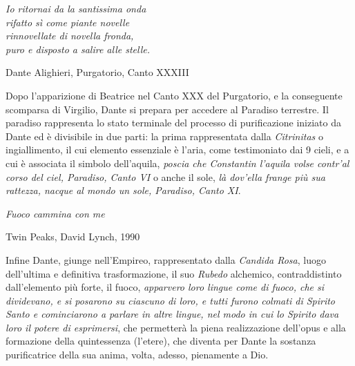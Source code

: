 \documentclass[a4paper,12pt]{report}
\begin{document}
\setlength{\epigraphwidth}{0.5\textwidth}
\epigraph{\textit{Io ritornai da la santissima onda \\
                  rifatto sì come piante novelle \\
                  rinnovellate di novella fronda, \\
                  \medskip
                  puro e disposto a salire alle stelle.}
         }
                  {Dante Alighieri, Purgatorio, Canto XXXIII }

Dopo l’apparizione di Beatrice nel Canto XXX del Purgatorio, e la conseguente scomparsa di Virgilio, Dante si prepara per accedere al Paradiso terrestre.
Il paradiso rappresenta lo stato terminale del processo di purificazione iniziato da Dante ed è divisibile in due parti: la prima rappresentata dalla \textit{Citrinitas} o ingiallimento, il cui elemento essenziale è l’aria, come testimoniato dai 9 cieli, e a cui è associata il simbolo dell’aquila, \textit{poscia che Constantin l’aquila volse contr’al corso del ciel, Paradiso, Canto VI} o anche il sole, \textit{là dov’ella frange più sua rattezza, nacque al mondo un sole, Paradiso, Canto XI}.

\setlength{\epigraphwidth}{0.5\textwidth}
\epigraph{\textit{Fuoco cammina con me}}{Twin Peaks, David Lynch, 1990}

Infine Dante, giunge nell’Empireo, rappresentato dalla \textit{Candida Rosa}, luogo dell’ultima e definitiva trasformazione, il suo \textit{Rubedo} alchemico, contraddistinto dall’elemento più forte, il fuoco, \textit{apparvero loro lingue come di fuoco, che si dividevano, e si posarono su ciascuno di loro, e tutti furono colmati di Spirito Santo e cominciarono a parlare in altre lingue, nel modo in cui lo Spirito dava loro il potere di esprimersi}\cite{atti}, che permetterà la piena realizzazione dell’opus e alla formazione della quintessenza (l’etere), che diventa per Dante la sostanza purificatrice della sua anima, volta, adesso, pienamente a Dio.\\
\medskip
\end{document}
